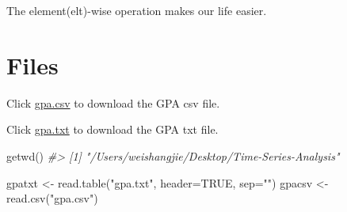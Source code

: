 \documentclass[
]{book}
\newenvironment{Shaded}{\begin{snugshade}}{\end{snugshade}}
\newcommand{\AttributeTok}[1]{\textcolor[rgb]{0.77,0.63,0.00}{#1}}
\newcommand{\CommentTok}[1]{\textcolor[rgb]{0.56,0.35,0.01}{\textit{#1}}}
\newcommand{\ConstantTok}[1]{\textcolor[rgb]{0.00,0.00,0.00}{#1}}
\newcommand{\FunctionTok}[1]{\textcolor[rgb]{0.00,0.00,0.00}{#1}}
\newcommand{\NormalTok}[1]{#1}
\newcommand{\OtherTok}[1]{\textcolor[rgb]{0.56,0.35,0.01}{#1}}
\newcommand{\SpecialCharTok}[1]{\textcolor[rgb]{0.00,0.00,0.00}{#1}}
\newcommand{\StringTok}[1]{\textcolor[rgb]{0.31,0.60,0.02}{#1}}
\begin{document}
The element(elt)-wise operation makes our life easier.

\hypertarget{files}{%
\section{Files}\label{files}}

Click \href{http://www.chrisbilder.com/stat878/sections/1/gpa.csv}{gpa.csv} to download the GPA csv file.

Click \href{http://www.chrisbilder.com/stat878/sections/1/gpa.txt}{gpa.txt} to download the GPA txt file.

\begin{Shaded}
\begin{Highlighting}[]
\FunctionTok{getwd}\NormalTok{()}
\CommentTok{\#\textgreater{} [1] "/Users/weishangjie/Desktop/Time{-}Series{-}Analysis"}
\end{Highlighting}
\end{Shaded}

\begin{Shaded}
\begin{Highlighting}[]
\NormalTok{gpatxt }\OtherTok{\textless{}{-}} \FunctionTok{read.table}\NormalTok{(}\StringTok{"gpa.txt"}\NormalTok{, }\AttributeTok{header=}\ConstantTok{TRUE}\NormalTok{, }\AttributeTok{sep=}\StringTok{""}\NormalTok{)}
\NormalTok{gpacsv }\OtherTok{\textless{}{-}} \FunctionTok{read.csv}\NormalTok{(}\StringTok{"gpa.csv"}\NormalTok{)}
\end{Highlighting}
\end{Shaded}

\begin{Shaded}
\end{Shaded}

\begin{Shaded}
\end{Shaded}
\end{document}
